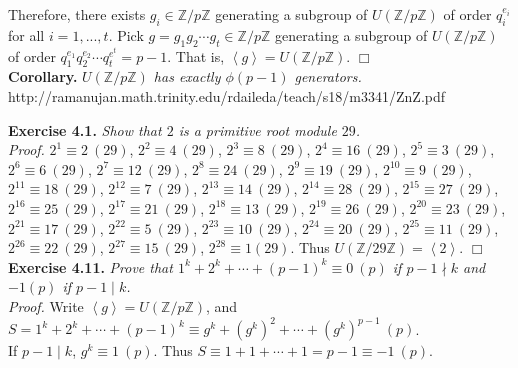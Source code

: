 \documentclass{article}
\begin{document}
Therefore, there exists $g_i \in \mathbb{Z}/p\mathbb{Z}$ generating a subgroup of
$U(\mathbb{Z}/p\mathbb{Z})$ of order $q_i^{e_i}$ for all $i = 1, ..., t$.
Pick $g = g_1 g_2 \cdots g_t \in \mathbb{Z}/p\mathbb{Z}$ generating a subgroup of
$U(\mathbb{Z}/p\mathbb{Z})$ of order $q_1^{e_1} q_2^{e_2} \cdots q_t^{e^t} = p - 1$.
That is, $\left \langle g \right \rangle = U(\mathbb{Z}/p\mathbb{Z})$.
$\Box$ \\

\textbf{Corollary.} \emph{$U(\mathbb{Z}/p\mathbb{Z})$ has exactly $\phi(p - 1)$ generators.} \\

http://ramanujan.math.trinity.edu/rdaileda/teach/s18/m3341/ZnZ.pdf



\textbf{Exercise 4.1.} \emph{Show that $2$ is a primitive root module $29$.}\\

\emph{Proof.}
$2^1 \equiv 2 \: (29)$,
$2^2 \equiv 4 \: (29)$,
$2^3 \equiv 8 \: (29)$,
$2^4 \equiv 16 \: (29)$,
$2^5 \equiv 3 \: (29)$,
$2^6 \equiv 6 \: (29)$,
$2^7 \equiv 12 \: (29)$,
$2^8 \equiv 24 \: (29)$,
$2^9 \equiv 19 \: (29)$,
$2^{10} \equiv 9 \: (29)$,
$2^{11} \equiv 18 \: (29)$,
$2^{12} \equiv 7 \: (29)$,
$2^{13} \equiv 14 \: (29)$,
$2^{14} \equiv 28 \: (29)$,
$2^{15} \equiv 27 \: (29)$,
$2^{16} \equiv 25 \: (29)$,
$2^{17} \equiv 21 \: (29)$,
$2^{18} \equiv 13 \: (29)$,
$2^{19} \equiv 26 \: (29)$,
$2^{20} \equiv 23 \: (29)$,
$2^{21} \equiv 17 \: (29)$,
$2^{22} \equiv 5 \: (29)$,
$2^{23} \equiv 10 \: (29)$,
$2^{24} \equiv 20 \: (29)$,
$2^{25} \equiv 11 \: (29)$,
$2^{26} \equiv 22 \: (29)$,
$2^{27} \equiv 15 \: (29)$,
$2^{28} \equiv 1 (29)$. Thus
$U(\mathbb{Z}/29\mathbb{Z}) = \left \langle 2 \right \rangle$.
$\Box$ \\

\textbf{Exercise 4.11.} \emph{Prove that $1^k + 2^k + \cdots + (p-1)^k \equiv 0 \: (p)$
if $p - 1 \nmid k$ and $-1 (p)$ if $p - 1 \mid k$.} \\

\emph{Proof.}
Write $\left \langle g \right \rangle = U(\mathbb{Z}/p\mathbb{Z})$, and
$S = 1^k + 2^k + \cdots + (p-1)^k \equiv g^k + (g^k)^2 + \cdots + (g^k)^{p - 1} \: (p)$. \\

If $p - 1 \mid k$, $g^k \equiv 1 \: (p)$. Thus
$S \equiv 1 + 1 + \cdots + 1 = p - 1 \equiv -1 \: (p)$. \\
\end{document}
